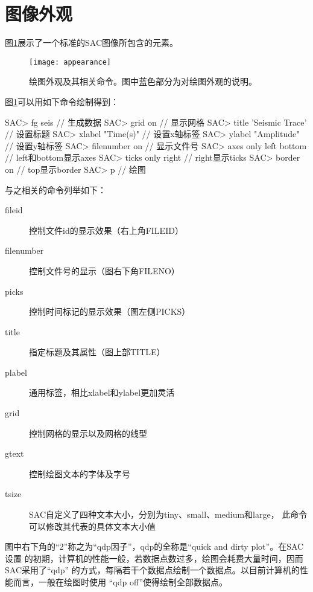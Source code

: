 \section{图像外观}
\label{sec:plot-appearance}

图\ref{fig:plot-appearance}展示了一个标准的SAC图像所包含的元素。

\begin{figure}[H]
\centering
\texttt{[image: appearance]}
\caption[绘图外观相关命令]{绘图外观及其相关命令。图中蓝色部分为对绘图外观的说明。}
\label{fig:plot-appearance}
\end{figure}

图\ref{fig:plot-appearance}可以用如下命令绘制得到：
\begin{SACCode}
SAC> fg seis                // 生成数据
SAC> grid on                // 显示网格                                          
SAC> title 'Seismic Trace'  // 设置标题                                          
SAC> xlabel "Time(s)"       // 设置x轴标签                                          
SAC> ylabel "Amplitude"     // 设置y轴标签                                       
SAC> filenumber on          // 显示文件号                                       
SAC> axes only left bottom  // left和bottom显示axes
SAC> ticks only right       // right显示ticks    
SAC> border on              // top显示border                                     
SAC> p                      // 绘图
\end{SACCode}

与之相关的命令列举如下：
\begin{description}
\item [fileid] 控制文件id的显示效果（右上角FILEID）
\item [filenumber] 控制文件号的显示（图右下角FILENO）
\item [picks] 控制时间标记的显示效果（图左侧PICKS）
\item [title] 指定标题及其属性（图上部TITLE）
\item [plabel] 通用标签，相比xlabel和ylabel更加灵活
\item [grid] 控制网格的显示以及网格的线型
\item [gtext] 控制绘图文本的字体及字号
\item [tsize] SAC自定义了四种文本大小，分别为tiny、small、medium和large，
    此命令可以修改其代表的具体文本大小值
\end{description}

图中右下角的``2''称之为``qdp因子''，qdp的全称是``quick and dirty plot''。在SAC设置
的初期，计算机的性能一般，若数据点数过多，绘图会耗费大量时间，因而SAC采用了``qdp''
的方式，每隔若干个数据点绘制一个数据点。以目前计算机的性能而言，一般在绘图时使用
``qdp off''使得绘制全部数据点。

